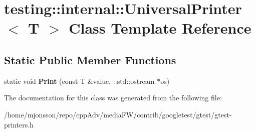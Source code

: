 \hypertarget{classtesting_1_1internal_1_1UniversalPrinter}{}\section{testing\+:\+:internal\+:\+:Universal\+Printer$<$ T $>$ Class Template Reference}
\label{classtesting_1_1internal_1_1UniversalPrinter}
\subsection*{Static Public Member Functions}
\begin{DoxyCompactItemize}
\item 
\mbox{\label{classtesting_1_1internal_1_1UniversalPrinter_aecec021e1abbaa260b701e24e3fe33eb}} 
static void {\bfseries Print} (const T \&value, \+::std\+::ostream $\ast$os)
\end{DoxyCompactItemize}


The documentation for this class was generated from the following file\+:\begin{DoxyCompactItemize}
\item 
/home/mjonsson/repo/cpp\+Adv/media\+F\+W/contrib/googletest/gtest/gtest-\/printers.\+h\end{DoxyCompactItemize}
